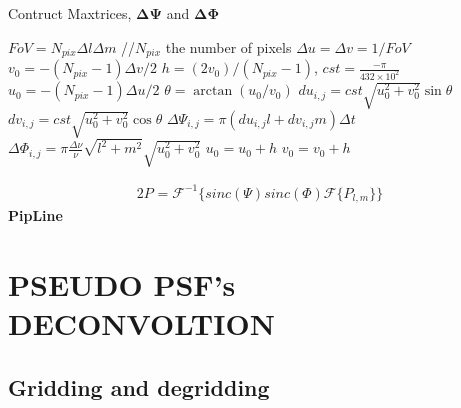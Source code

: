 \begin{algorithm}
\caption{Contruct Maxtrices, $\mathbf{\Delta \Psi}$ and $\mathbf{\Delta \Phi}$}
\label{CHalgorithm}
\begin{algorithmic}[1]
\State $FoV = N_{pix}\Delta l \Delta m$ //$N_{pix}$ the number of pixels
\State $\Delta u=\Delta v=1/FoV$
\State $v_0=-(N_{pix}-1)\Delta v /2$ 
\State $h=(2v_0)/(N_{pix}-1)$, $cst = \frac{-\pi}{432\times 10^2}$
\State $u_0=-(N_{pix}-1) \Delta u /2$
\State $\theta = \arctan(u_0/v_0)$
\State $du_{i,j} = cst\sqrt{u_0^2+v_0^2}\sin \theta$
\State $dv_{i,j} = cst\sqrt{u_0^2+v_0^2}\cos \theta$
\State $\Delta \Psi_{i,j}= \pi(du_{i,j}l+dv_{i,j}m)\Delta t$
\State $\Delta \Phi_{i,j}= \pi  \frac{\Delta \nu}{\nu}\sqrt{l^2+m^2}\sqrt{u_0^2+v_0^2}$
\State $u_{0}=u_{0}+h$
\EndFor
\State $v_{0}=v_{0}+h$
\EndFor
\EndProcedure
\end{algorithmic}
\end{algorithm}

\begin{alignat}{2}
P_{}= \mathcal{F}^{-1}\Big\{sinc(\Psi) sinc(\Phi) \mathcal{F}\{P_{l,m}\}\Big\}
\end{alignat}
{\bf PipLine}
\section{PSEUDO PSF's DECONVOLTION}
\subsection{Gridding and degridding}
